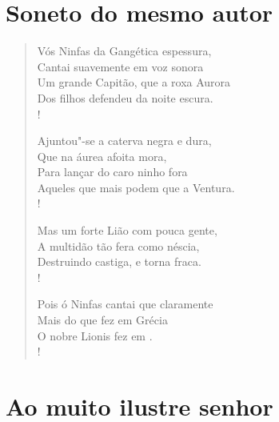\chapter*{Soneto do mesmo autor} 

%



\begin{verse}
Vós Ninfas da Gangética espessura,\\  
Cantai suavemente em voz sonora\\
Um grande Capitão, que a roxa Aurora\\
Dos filhos defendeu da noite escura.\\!

Ajuntou"-se a caterva negra e dura,\\
Que na áurea  afoita mora,\\
Para lançar do caro ninho fora\\
Aqueles que mais podem que a Ventura.\\!

Mas um forte Lião com pouca gente,\\
A multidão tão fera como néscia,\\
Destruindo castiga, e torna fraca.\\!

Pois ó Ninfas cantai que claramente\\
Mais do que fez  em Grécia\\  
O nobre Lionis fez em .\\!
\end{verse}



\chapter*{Ao muito ilustre senhor}

%
%



